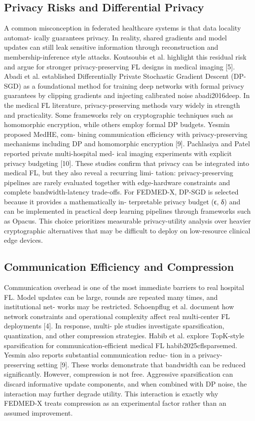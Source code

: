 \subsection{Privacy Risks and Differential Privacy}
A common misconception in federated healthcare systems is that data locality automat- ically guarantees privacy. In reality, shared gradients and model updates can still leak sensitive information through reconstruction and membership-inference style attacks.
Koutsoubis et al. highlight this residual risk and argue for stronger privacy-preserving
FL designs in medical imaging [5].
Abadi et al.
established Differentially Private
Stochastic Gradient Descent (DP-SGD) as a foundational method for training deep networks with formal privacy guarantees by clipping gradients and injecting calibrated noise abadi2016deep.
In the medical FL literature, privacy-preserving methods vary widely in strength and practicality. Some frameworks rely on cryptographic techniques such as homomorphic encryption, while others employ formal DP budgets. Yesmin proposed MedHE, com- bining communication efficiency with privacy-preserving mechanisms including DP and homomorphic encryption [9]. Pachlasiya and Patel reported private multi-hospital med- ical imaging experiments with explicit privacy budgeting [10]. These studies confirm that privacy can be integrated into medical FL, but they also reveal a recurring limi- tation: privacy-preserving pipelines are rarely evaluated together with edge-hardware constraints and complete bandwidth-latency trade-offs.
For FEDMED-X, DP-SGD is selected because it provides a mathematically in- terpretable privacy budget (ϵ, δ) and can be implemented in practical deep learning pipelines through frameworks such as Opacus.
This choice prioritizes measurable privacy-utility analysis over heavier cryptographic alternatives that may be difficult to deploy on low-resource clinical edge devices.

\subsection{Communication Efficiency and Compression}
Communication overhead is one of the most immediate barriers to real hospital FL.
Model updates can be large, rounds are repeated many times, and institutional net- works may be restricted. Schoenpflug et al. document how network constraints and operational complexity affect real multi-center FL deployments [4]. In response, multi- ple studies investigate sparsification, quantization, and other compression strategies.
Habib et al. explore TopK-style sparsification for communication-efficient medical
FL habib2025cflsparsemed. Yesmin also reports substantial communication reduc- tion in a privacy-preserving setting [9]. These works demonstrate that bandwidth can be reduced significantly. However, compression is not free. Aggressive sparsification can discard informative update components, and when combined with DP noise, the interaction may further degrade utility. This interaction is exactly why FEDMED-X treats compression as an experimental factor rather than an assumed improvement.
